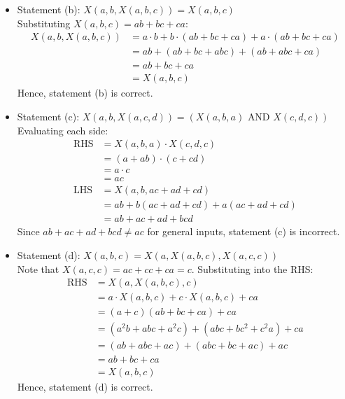 \begin{enumerate}[label=\thesubsection.\arabic*, ref=\thesubsection.\theenumi]
\begin{itemize}
    \item Statement (b): $X(a,b,X(a,b,c)) = X(a,b,c)$ \\
    Substituting $X(a,b,c) = ab + bc + ca$:
    \begin{align}
    X(a,b,X(a,b,c)) &= a \cdot b + b \cdot (ab + bc + ca) + a \cdot (ab + bc + ca) \\
                    &= ab + (ab + bc + abc) + (ab + abc + ca) \\
                    &= ab + bc + ca \\
                    &= X(a,b,c)
    \end{align}
    Hence, statement (b) is correct.

    \item Statement (c): $X(a,b,X(a,c,d)) = (X(a,b,a) \text{ AND } X(c,d,c))$ \\
    Evaluating each side:
    \begin{align}
    \text{RHS} &= X(a,b,a) \cdot X(c,d,c) \\
               &= (a + ab) \cdot (c + cd) \\
               &= a \cdot c \\
               &= ac \\
    \text{LHS} &= X(a, b, ac + ad + cd) \\
               &= ab + b(ac + ad + cd) + a(ac + ad + cd) \\
               &= ab + ac + ad + bcd
    \end{align}
    Since $ab + ac + ad + bcd \neq ac$ for general inputs, statement (c) is incorrect.

    \item Statement (d): $X(a,b,c) = X(a, X(a,b,c), X(a,c,c))$ \\
    Note that $X(a,c,c) = ac + cc + ca = c$. Substituting into the RHS:
    \begin{align}
    \text{RHS} &= X(a, X(a,b,c), c) \\
               &= a \cdot X(a,b,c) + c \cdot X(a,b,c) + ca \\
               &= (a + c)(ab + bc + ca) + ca \\
               &= (a^2 b + abc + a^2 c) + (abc + bc^2 + c^2 a) + ca \\
               &= (ab + abc + ac) + (abc + bc + ac) + ac \\
               &= ab + bc + ca \\
               &= X(a,b,c)
    \end{align}
    Hence, statement (d) is correct.
\end{itemize}


\end{enumerate}
